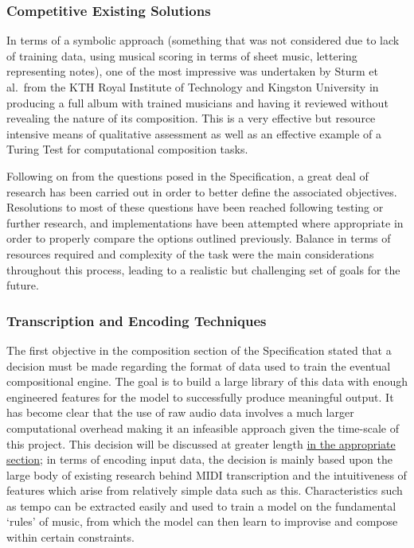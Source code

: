 \documentclass[12pt,]{article}
\begin{document}
\hypertarget{competitive-existing-solutions}{%
\subsubsection{Competitive Existing
Solutions}\label{competitive-existing-solutions}}

In terms of a symbolic approach (something that was not considered due
to lack of training data, using musical scoring in terms of sheet music,
lettering representing notes), one of the most impressive was undertaken
by Sturm et al.~from the KTH Royal Institute of Technology and Kingston
University in producing a full album with trained musicians and having
it reviewed without revealing the nature of its composition. This is a
very effective but resource intensive means of qualitative assessment as
well as an effective example of a Turing Test for computational
composition tasks.

Following on from the questions posed in the Specification, a great deal
of research has been carried out in order to better define the
associated objectives. Resolutions to most of these questions have been
reached following testing or further research, and implementations have
been attempted where appropriate in order to properly compare the
options outlined previously. Balance in terms of resources required and
complexity of the task were the main considerations throughout this
process, leading to a realistic but challenging set of goals for the
future.

\hypertarget{transcription-and-encoding-techniques}{%
\subsubsection{Transcription and Encoding
Techniques}\label{transcription-and-encoding-techniques}}

The first objective in the composition section of the Specification
stated that a decision must be made regarding the format of data used to
train the eventual compositional engine. The goal is to build a large
library of this data with enough engineered features for the model to
successfully produce meaningful output. It has become clear that the use
of raw audio data involves a much larger computational overhead making
it an infeasible approach given the time-scale of this project. This
decision will be discussed at greater length
\protect\hyperlink{neuralnetworkapproach}{in the appropriate section};
in terms of encoding input data, the decision is mainly based upon the
large body of existing research behind MIDI transcription and the
intuitiveness of features which arise from relatively simple data such
as this. Characteristics such as tempo can be extracted easily and used
to train a model on the fundamental `rules' of music, from which the
model can then learn to improvise and compose within certain
constraints.
\end{document}
